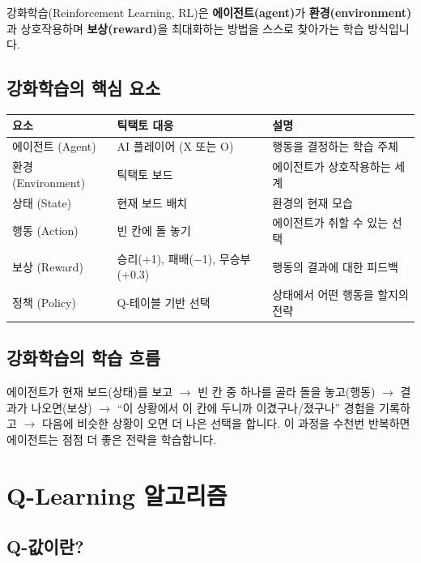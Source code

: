 \documentclass[11pt,a4paper]{article}
\begin{document}
강화학습(Reinforcement Learning, RL)은 \textbf{에이전트(agent)}가 \textbf{환경(environment)}과 상호작용하며 \textbf{보상(reward)}을 최대화하는 방법을 스스로 찾아가는 학습 방식입니다.

\subsection{강화학습의 핵심 요소}

\begin{center}
\renewcommand{\arraystretch}{1.4}
\begin{tabular}{|l|l|p{6cm}|}
\hline
\rowcolor{tableheader}
\textbf{요소} & \textbf{틱택토 대응} & \textbf{설명} \\
\hline
에이전트 (Agent) & AI 플레이어 (X 또는 O) & 행동을 결정하는 학습 주체 \\
\hline
환경 (Environment) & 틱택토 보드 & 에이전트가 상호작용하는 세계 \\
\hline
상태 (State) & 현재 보드 배치 & 환경의 현재 모습 \\
\hline
행동 (Action) & 빈 칸에 돌 놓기 & 에이전트가 취할 수 있는 선택 \\
\hline
보상 (Reward) & 승리(+1), 패배($-$1), 무승부(+0.3) & 행동의 결과에 대한 피드백 \\
\hline
정책 (Policy) & Q-테이블 기반 선택 & 상태에서 어떤 행동을 할지의 전략 \\
\hline
\end{tabular}
\end{center}

\subsection{강화학습의 학습 흐름}

에이전트가 현재 보드(상태)를 보고 $\to$ 빈 칸 중 하나를 골라 돌을 놓고(행동) $\to$ 결과가 나오면(보상) $\to$ ``이 상황에서 이 칸에 두니까 이겼구나/졌구나'' 경험을 기록하고 $\to$ 다음에 비슷한 상황이 오면 더 나은 선택을 합니다. 이 과정을 수천 번 반복하면 에이전트는 점점 더 좋은 전략을 학습합니다.

\section{Q-Learning 알고리즘}

\subsection{Q-값이란?}
\end{document}
